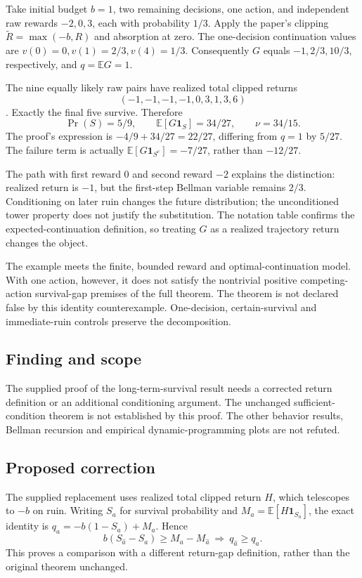 \documentclass[11pt]{article}
\begin{document}
Take initial budget \(b=1\), two remaining decisions, one action, and independent raw rewards \(-2,0,3\), each with probability \(1/3\). Apply the paper’s clipping \(\widetilde R=\max(-b,R)\) and absorption at zero. The one-decision continuation values are \(v(0)=0,v(1)=2/3,v(4)=1/3\). Consequently \(G\) equals \(-1,2/3,10/3\), respectively, and \(q=\mathbb EG=1\).

The nine equally likely raw pairs have realized total clipped returns \[(-1,-1,-1,-1,0,3,1,3,6)\]. Exactly the final five survive. Therefore \[\Pr(S)=5/9,\qquad\mathbb E[G\mathbf1_S]=34/27,\qquad\nu=34/15.\] The proof’s expression is \(-4/9+34/27=22/27\), differing from \(q=1\) by \(5/27\). The failure term is actually \(\mathbb E[G\mathbf1_{S^c}]=-7/27\), rather than \(-12/27\).

The path with first reward \(0\) and second reward \(-2\) explains the distinction: realized return is \(-1\), but the first-step Bellman variable remains \(2/3\). Conditioning on later ruin changes the future distribution; the unconditioned tower property does not justify the substitution. The notation table confirms the expected-continuation definition, so treating \(G\) as a realized trajectory return changes the object.

The example meets the finite, bounded reward and optimal-continuation model. With one action, however, it does not satisfy the nontrivial positive competing-action survival-gap premises of the full theorem. The theorem is not declared false by this identity counterexample. One-decision, certain-survival and immediate-ruin controls preserve the decomposition.

\subsection*{Finding and scope}

The supplied proof of the long-term-survival result needs a corrected return definition or an additional conditioning argument. The unchanged sufficient-condition theorem is not established by this proof. The other behavior results, Bellman recursion and empirical dynamic-programming plots are not refuted.

\subsection*{Proposed correction}

The supplied replacement uses realized total clipped return \(H\), which telescopes to \(-b\) on ruin. Writing \(S_a\) for survival probability and \(M_a=\mathbb E[H\mathbf1_{S_a}]\), the exact identity is \(q_a=-b(1-S_a)+M_a\). Hence \[b(S_{\hat a}-S_a)\geq M_a-M_{\hat a}\ \Longrightarrow\ q_{\hat a}\geq q_a.\] This proves a comparison with a different return-gap definition, rather than the original theorem unchanged.
\end{document}
